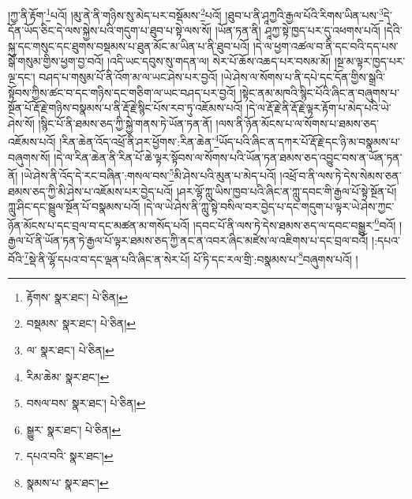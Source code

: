 །ཀྱ་ནི་རྟོག་\footnote{རྟོགས་  སྣར་ཐང་།  པེ་ཅིན། }པའོ། །མུ་ནེ་ནི་གཉིས་སུ་མེད་པར་བསྡོམས་\footnote{བསྡམས་  སྣར་ཐང་།  པེ་ཅིན། }པའོ། །ཐུབ་པ་ནི་ཤཱཀྱའི་རྒྱལ་པོའི་རིགས་ཡིན་པས་\footnote{ལ་  སྣར་ཐང་།  པེ་ཅིན། }དེ་དོན་ཡོད་ཅིང་དེ་ལས་སྐྱེས་པའི་གདུག་པ་ཐུབ་པ་སྟེ་ལས་སོ། །ཡོན་ཏན་ནི། ཤཱཀྱ་སྟེ་ཁྱད་པར་དུ་འཕགས་པའོ། །དེའི་སྐུ་དང་གསུང་དང་ཐུགས་བསྡམས་པ་ཐུན་མོང་མ་ཡིན་པ་ནི་ཐུབ་པའོ། །དེ་ལ་ཕྱག་འཚལ་བ་ནི་དང་བའི་དད་པས་སྒོ་གསུམ་གྱིས་ཕྱག་བྱ་བའོ། །འདི་ཡང་དབུས་སུ་གདན་ལ། སེར་པོ་ཆོས་འཆད་པར་བསམ་མོ། །སྔ་མ་ལྟར་ཁྱད་པར་ལྔ་དང་། བཤད་པ་གསུམ་པོ་ནི་འོག་མ་ལ་ཡང་ཤེས་པར་བྱའོ། །ཡེ་ཤེས་ལ་སོགས་པ་ནི་དཔེ་དང་དོན་གྱིས་སྒྲའི་སྟོབས་ཀྱིས་ཚང་བ་དང་གཉིས་དང་གཅིག་ལ་ཡང་བཤད་པར་བྱའོ། །སྟེང་ནམ་མཁའི་སྙིང་པོའི་ཞིང་ན་བཞུགས་པ་སྔོན་པོ་རྡོ་རྗེ་གཉིས་བསྣམས་པ་ནི་རྡོ་རྗེ་སྙིང་པོས་རབ་ཏུ་འཇོམས་པའོ། །དེ་ལ་རྡོ་རྗེ་ནི་རྡོ་རྗེ་ལྟར་རྟོག་པ་མེད་པའི་ཡེ་ཤེས་སོ། །སྙིང་པོ་ནི་ཐམས་ཅད་ཀྱི་སྐྱེ་གནས་ཏེ་ཡོན་ཏན་ནོ། །ལས་ནི་ཉོན་མོངས་པ་ལ་སོགས་པ་ཐམས་ཅད་འཇོམས་པའོ། །རིན་ཆེན་འོད་འཕྲོ་ནི་ཤར་ཕྱོགས་:རིན་ཆེན་\footnote{རིམ་ཆེམ་  སྣར་ཐང་། }ཡོད་པའི་ཞིང་ན་དཀར་པོ་རྡོ་རྗེ་དང་ཉི་མ་བསྣམས་པ་བཞུགས་སོ། །དེ་ལ་རིན་ཆེན་ནི་རིན་པོ་ཆེ་ལྟར་སྟོབས་ལ་སོགས་པའི་ཡོན་ཏན་ཐམས་ཅད་འབྱུང་བས་ན་ཡོན་ཏན་ནོ། །ཡེ་ཤེས་ནི་འོད་དེ་རང་བཞིན་:གསལ་བས་\footnote{བསལ་བས་  སྣར་ཐང་།  པེ་ཅིན། }མི་ཤེས་པའི་མུན་པ་མེད་པའོ། །འཕྲོ་བ་ནི་ལས་ཏེ་དེས་སེམས་ཅན་ཐམས་ཅད་ཀྱི་མི་ཤེས་པ་འཇོམས་པར་བྱེད་པའོ། །ཤར་ལྷོ་ཀླུ་ཡིས་ཁྱབ་པའི་ཞིང་ན་ཀླུ་དབང་གི་རྒྱལ་པོ་སྟེ་སྔོན་པོ། ཀླུ་ཤིང་དང་སྦྲུལ་སྔོན་པོ་བསྣམས་པའོ། །དེ་ལ་ཡེ་ཤེས་ནི་ཀླུ་སྟེ་བསིལ་བར་བྱེད་པ་དང་གདུག་པ་ལྟར་ཡེ་ཤེས་ཀྱང་ཉོན་མོངས་པ་དང་བྲལ་བ་དང་མཚན་མ་གསོད་པའོ། །དབང་པོ་ནི་ལས་ཏེ་དེས་ཐམས་ཅད་ལ་དབང་བསྒྱུར་\footnote{སྒྱུར་  སྣར་ཐང་།  པེ་ཅིན། }བའོ། །རྒྱལ་པོ་ནི་ཡོན་ཏན་ཏེ་རྒྱལ་པོ་ལྟར་ཐམས་ཅད་ཀྱི་ནང་ན་འབར་ཞིང་མཛེས་ལ་འཇིགས་པ་དང་བྲལ་བའོ། །:དཔའ་བོའི་\footnote{དཔའ་བའི་  སྣར་ཐང་། }སྡེ་ནི་ལྷོ་དཔའ་བ་དང་ལྡན་པའི་ཞིང་ན་སེར་པོ། པོ་ཏི་དང་རལ་གྲི་:བསྣམས་པ་\footnote{སྣམས་པ་  སྣར་ཐང་། }བཞུགས་པའོ། །
